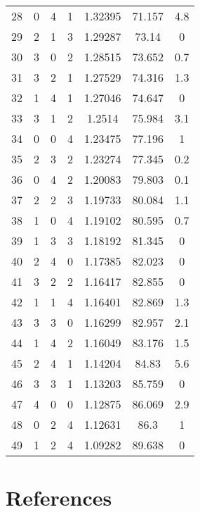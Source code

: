 \documentclass[11pt]{article}
\begin{document}
\begin{table}[htbp]
\begin{tabular}{ccccccc}
			28 & 0 & 4 & 1 & 1.32395 & 71.157 & 4.8 \\
			29 & 2 & 1 & 3 & 1.29287 & 73.14 & 0 \\
			30 & 3 & 0 & 2 & 1.28515 & 73.652 & 0.7 \\
			31 & 3 & 2 & 1 & 1.27529 & 74.316 & 1.3 \\
			32 & 1 & 4 & 1 & 1.27046 & 74.647 & 0 \\
			33 & 3 & 1 & 2 & 1.2514 & 75.984 & 3.1 \\
			34 & 0 & 0 & 4 & 1.23475 & 77.196 & 1 \\
			35 & 2 & 3 & 2 & 1.23274 & 77.345 & 0.2 \\
			36 & 0 & 4 & 2 & 1.20083 & 79.803 & 0.1 \\
			37 & 2 & 2 & 3 & 1.19733 & 80.084 & 1.1 \\
			38 & 1 & 0 & 4 & 1.19102 & 80.595 & 0.7 \\
			39 & 1 & 3 & 3 & 1.18192 & 81.345 & 0 \\
			40 & 2 & 4 & 0 & 1.17385 & 82.023 & 0 \\
			41 & 3 & 2 & 2 & 1.16417 & 82.855 & 0 \\
			42 & 1 & 1 & 4 & 1.16401 & 82.869 & 1.3 \\
			43 & 3 & 3 & 0 & 1.16299 & 82.957 & 2.1 \\
			44 & 1 & 4 & 2 & 1.16049 & 83.176 & 1.5 \\
			45 & 2 & 4 & 1 & 1.14204 & 84.83 & 5.6 \\
			46 & 3 & 3 & 1 & 1.13203 & 85.759 & 0 \\
			47 & 4 & 0 & 0 & 1.12875 & 86.069 & 2.9 \\
			48 & 0 & 2 & 4 & 1.12631 & 86.3 & 1 \\
			49 & 1 & 2 & 4 & 1.09282 & 89.638 & 0 \\
			\bottomrule
		\end{tabular}%
		\label{tab:TiO2_Peaks}%
	\end{table}%
	
	
\clearpage
	
	\section{References}
	
\end{document}
